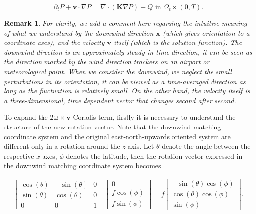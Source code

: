\documentclass[11pt]{article}
\newtheorem{remark}{Remark}
\begin{document}
\begin{equation} \label{diffusive}
  \partial_t P + \mathbf{v} \cdot \nabla P = \nabla \cdot (\mathbf{K} \nabla P) + Q \text{ in } \Omega_{\epsilon} \times (0,T).
\end{equation}

\begin{remark} \normalfont
For clarity, we add a comment here regarding the intuitive meaning of what we understand by the downwind direction $\mathbf{x}$ (which gives orientation to a coordinate axes), and the velocity $\mathbf{v}$ itself (which is the solution function). The downwind direction is an approximately steady-in-time direction, it can be seen as the direction marked by the wind direction trackers on an airport or meteorological point. When we consider the downwind, we neglect the small perturbations in its orientation, it can be viewed as a time-averaged direction as long as the fluctuation is relatively small. On the other hand, the velocity itself is a three-dimensional, time dependent vector that changes second after second.
\end{remark}

To expand the $2 \mathbf{\omega} \times \mathbf{v}$ Coriolis term, firstly it is necessary to understand the structure of the new rotation vector. Note that the downwind matching coordinate system and the original east-north-upwards oriented system are different only in a rotation around the $z$ axis. Let $\theta$ denote the angle between the respective $x$ axes, $\phi$ denotes the latitude, then the rotation vector expressed in the downwind matching coordinate system becomes

\begin{gather}
 \begin{bmatrix} \cos(\theta) & -\sin(\theta) & 0 \\ \sin(\theta) & \cos(\theta) & 0 \\ 0 & 0 & 1 \end{bmatrix} \begin{bmatrix} 0 \\ f \cos(\phi) \\ f \sin(\phi) \end{bmatrix}
 =
  f \begin{bmatrix} -\sin(\theta)\cos(\phi) \\ \cos(\theta) \cos(\phi) \\ \sin(\phi) \end{bmatrix}.
\end{gather}
\end{document}
